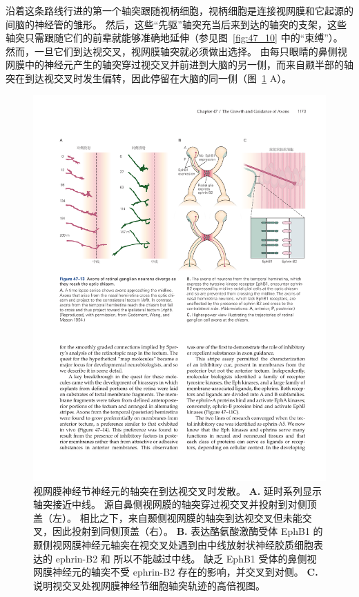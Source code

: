 沿着这条路线行进的第一个轴突跟随视柄细胞，视柄细胞是连接视网膜和它起源的间脑的神经管的雏形。
然后，这些“先驱”轴突充当后来到达的轴突的支架，这些轴突只需跟随它们的前辈就能够准确地延伸（参见图~\ref{fig:47_10} 中的“束缚”）。
然而，一旦它们到达视交叉，视网膜轴突就必须做出选择。
由每只眼睛的鼻侧视网膜中的神经元产生的轴突穿过视交叉并前进到大脑的另一侧，而来自颞半部的轴突在到达视交叉时发生偏转，因此停留在大脑的同一侧（图~\ref{fig:47_13} A）。


\begin{figure}[htbp]
	\centering
	\includegraphics[width=0.95\linewidth]{chap47/fig_47_13}
	\caption{视网膜神经节神经元的轴突在到达视交叉时发散。
		\textbf{A.} 延时系列显示轴突接近中线。
		源自鼻侧视网膜的轴突穿过视交叉并投射到对侧顶盖（左）。
		相比之下，来自颞侧视网膜的轴突到达视交叉但未能交叉，因此投射到同侧顶盖（右）。
		\textbf{B.} 表达酪氨酸激酶受体 EphB1 的颞侧视网膜神经元轴突在视交叉处遇到由中线放射状神经胶质细胞表达的 ephrin-B2 和 所以不能越过中线。
		缺乏 EphB1 受体的鼻侧视网膜神经元的轴突不受 ephrin-B2 存在的影响，并交叉到对侧。
		\textbf{C.} 说明视交叉处视网膜神经节细胞轴突轨迹的高倍视图。}
	\label{fig:47_13}
\end{figure}


